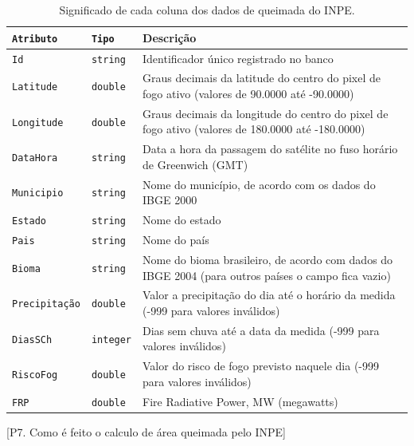\documentclass[cic,tc]{iiufrgs}
\begin{document}
\begin{table}[htbp]
\centering
\caption{Significado de cada coluna dos dados de queimada do INPE.}
\begin{tabular}{@{}llp{9cm}@{}}
 \toprule
 \texttt{Atributo} & \texttt{Tipo} & Descrição \\
 \midrule
 \texttt{Id} & \texttt{string} & Identificador único registrado no banco \\
 \texttt{Latitude} & \texttt{double} & Graus decimais da latitude do centro 
                     do pixel de fogo ativo (valores de 90.0000 até -90.0000) \\ 
 \texttt{Longitude} & \texttt{double} & Graus decimais da longitude do centro 
                     do pixel de fogo ativo (valores de 180.0000 até -180.0000) \\  
 \texttt{DataHora} & \texttt{string} & Data a hora da passagem do satélite no fuso 
                     horário de Greenwich (GMT) \\   
 \texttt{Municipio} & \texttt{string} & Nome do município, de acordo com os dados 
                     do IBGE 2000 \\
 \texttt{Estado} & \texttt{string} & Nome do estado \\
 \texttt{Pais} & \texttt{string} & Nome do país \\  
 \texttt{Bioma} & \texttt{string} & Nome do bioma brasileiro, de acordo com 
                     dados do IBGE 2004 (para outros países o campo fica vazio) \\
 \texttt{Precipitação} & \texttt{double} & Valor a precipitação do dia até 
                     o horário da medida (-999 para valores inválidos) \\
 \texttt{DiasSCh} & \texttt{integer} & Dias sem chuva até a data da medida 
                     (-999 para valores inválidos) \\
 \texttt{RiscoFog} & \texttt{double} & Valor do risco de fogo previsto naquele dia 
                     (-999 para valores inválidos) \\
 \texttt{FRP} & \texttt{double} & Fire Radiative Power, MW (megawatts) \\
 \bottomrule
\end{tabular}
\label{table:inpeColumns}
\end{table}

[P7. Como é feito o calculo de área queimada pelo INPE] \par
\end{document}
